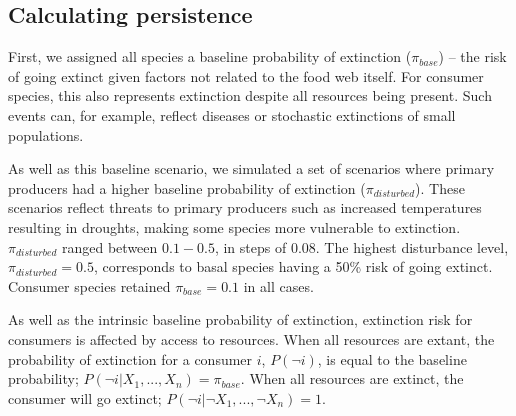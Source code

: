 \documentclass[12pt]{article}
\begin{document}
\begin{spacing}{2.0}
		
		
	\subsection*{Calculating persistence}	

		First, we assigned all species a baseline probability of extinction ($\pi_{base}$) -- the risk of going extinct given factors not related to the food web itself. 
		For consumer species, this also represents extinction despite all resources being present. 
		Such events can, for example, reflect diseases or stochastic extinctions of small populations. 


		As well as this baseline scenario, we simulated a set of scenarios where primary producers had a higher baseline probability of extinction ($\pi_{disturbed}$). 
		These scenarios reflect threats to primary producers such as increased temperatures resulting in droughts, making some species more vulnerable to extinction.
		$\pi_{disturbed}$ ranged between $0.1-0.5$, in steps of $0.08$. 
		The highest disturbance level, $\pi_{disturbed} = 0.5$, corresponds to basal species having a 50\% risk of going extinct. 
		Consumer species retained $\pi_{base}=0.1$ in all cases.
		
		
		As well as the intrinsic baseline probability of extinction, extinction risk for consumers is affected by access to resources. 
		When all resources are extant, the probability of extinction for a consumer $i$, $P(\lnot i)$, is equal to the baseline probability; $P(\lnot i|X_{1},...,X_{n}) = \pi_{base}$. 
		When all resources are extinct, the consumer will go extinct; $P(\lnot i|\lnot X_{1},...,\lnot X_{n})=1$. 



\end{spacing}
\end{document}
